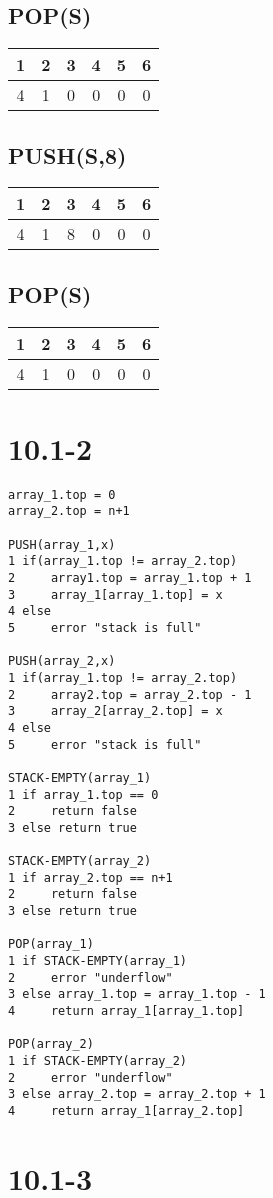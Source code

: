 \documentclass{article}
\begin{document}
\subsection*{POP(S)}
\begin{table}[H]
  \centering
  \begin{tabular}{|cccccc|}
    \hline
    1 & 2 & 3 & 4 & 5 & 6 \\
    \hline
    4 & 1 & 0 & 0 & 0 & 0 \\
    \hline
  \end{tabular}
\end{table}
\subsection*{PUSH(S,8)}
\begin{table}[H]
  \centering
  \begin{tabular}{|cccccc|}
    \hline
    1 & 2 & 3 & 4 & 5 & 6 \\
    \hline
    4 & 1 & 8 & 0 & 0 & 0 \\
    \hline
  \end{tabular}
\end{table}
\subsection*{POP(S)}
\begin{table}[H]
  \centering
  \begin{tabular}{|cccccc|}
    \hline
    1 & 2 & 3 & 4 & 5 & 6 \\
    \hline
    4 & 1 & 0 & 0 & 0 & 0 \\
    \hline
  \end{tabular}
\end{table}

\newpage
\section*{10.1-2}


\begin{verbatim}
array_1.top = 0
array_2.top = n+1

PUSH(array_1,x)
1 if(array_1.top != array_2.top)
2     array1.top = array_1.top + 1
3     array_1[array_1.top] = x
4 else
5     error "stack is full"

PUSH(array_2,x)
1 if(array_1.top != array_2.top)
2     array2.top = array_2.top - 1
3     array_2[array_2.top] = x
4 else
5     error "stack is full"

STACK-EMPTY(array_1)
1 if array_1.top == 0
2     return false
3 else return true

STACK-EMPTY(array_2)
1 if array_2.top == n+1
2     return false
3 else return true

POP(array_1)
1 if STACK-EMPTY(array_1)
2     error "underflow"
3 else array_1.top = array_1.top - 1
4     return array_1[array_1.top]

POP(array_2)
1 if STACK-EMPTY(array_2)
2     error "underflow"
3 else array_2.top = array_2.top + 1
4     return array_1[array_2.top]
\end{verbatim}

\section*{10.1-3}
\end{document}
